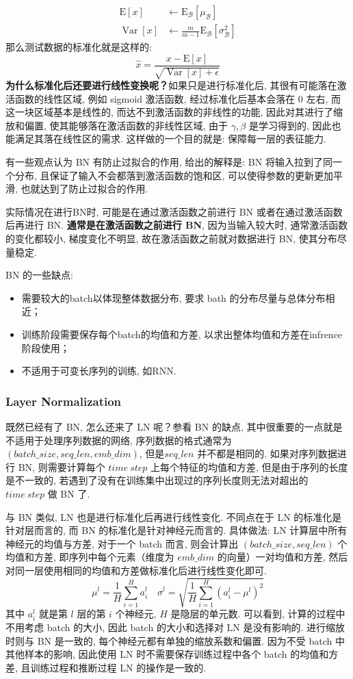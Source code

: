 $$
\begin{aligned}
	\mathrm{E}[x] & \leftarrow \mathrm{E}_{\mathcal{B}}\left[\mu_{\mathcal{B}}\right] \\
	\operatorname{Var}[x] & \leftarrow \frac{m}{m-1} \mathrm{E}_{\mathcal{B}}\left[\sigma_{\mathcal{B}}^{2}\right]
\end{aligned}
$$
那么测试数据的标准化就是这样的: 
$$
\widehat{x}=\frac{x-\mathrm{E}[x]}{\sqrt{\operatorname{Var}[x]+\epsilon}}
$$
\textbf{为什么标准化后还要进行线性变换呢？}如果只是进行标准化后, 其很有可能落在激活函数的线性区域, 例如 sigmoid 激活函数, 经过标准化后基本会落在 0 左右, 而这一块区域基本是线性的, 而达不到激活函数的非线性的功能, 因此对其进行了缩放和偏置, 使其能够落在激活函数的非线性区域, 由于 $\gamma, \beta$ 是学习得到的, 因此也能满足其落在线性区的需求. 这样做的一个目的就是: 保障每一层的表征能力. 

有一些观点认为 BN 有防止过拟合的作用, 给出的解释是: BN 将输入拉到了同一个分布, 且保证了输入不会都落到激活函数的饱和区, 可以使得参数的更新更加平滑, 也就达到了防止过拟合的作用. 


实际情况在进行BN时, 可能是在通过激活函数之前进行 BN 或者在通过激活函数后再进行 BN. \textbf{通常是在激活函数之前进行 BN}, 因为当输入较大时, 通常激活函数的变化都较小, 梯度变化不明显, 故在激活函数之前就对数据进行 BN, 使其分布尽量稳定. 

BN 的一些缺点: 
\begin{itemize}
	\item 需要较大的batch以体现整体数据分布, 要求 bath 的分布尽量与总体分布相近；
	\item 训练阶段需要保存每个batch的均值和方差, 以求出整体均值和方差在infrence阶段使用；
	\item 不适用于可变长序列的训练, 如RNN. 
\end{itemize}

\subsubsection{Layer Normalization}
既然已经有了 BN, 怎么还来了 LN 呢？参看 BN 的缺点, 其中很重要的一点就是不适用于处理序列数据的网络, 序列数据的格式通常为 $(batch\_size, seq\_len, emb\_dim)$, 但是$seq\_len$ 并不都是相同的. 如果对序列数据进行 BN, 则需要计算每个 $time\ step$ 上每个特征的均值和方差, 但是由于序列的长度是不一致的, 若遇到了没有在训练集中出现过的序列长度则无法对超出的 $time\ step$ 做 BN 了. 

与 BN 类似, LN 也是进行标准化后再进行线性变化. 不同点在于 LN 的标准化是针对层而言的, 而 BN 的标准化是针对神经元而言的. 具体做法: LN 计算层中所有神经元的均值与方差, 对于一个 batch 而言, 则会计算出 $(batch\_size, seq\_len)$ 个均值和方差, 即序列中每个元素（维度为 $emb\_dim$ 的向量）一对均值和方差, 然后对同一层使用相同的均值和方差做标准化后进行线性变化即可. 
$$
\mu^{l}=\frac{1}{H} \sum_{i=1}^{H} a_{i}^{l} \quad \sigma^{l}=\sqrt{\frac{1}{H} \sum_{i=1}^{H}\left(a_{i}^{l}-\mu^{l}\right)^{2}}
$$
其中 $a_i^l$ 就是第 $l$ 层的第 $i$ 个神经元, $H$ 是隐层的单元数. 可以看到, 计算的过程中不用考虑 batch 的大小, 因此 batch 的大小和选择对 LN 是没有影响的. 进行缩放时则与 BN 是一致的, 每个神经元都有单独的缩放系数和偏置. 因为不受 batch 中其他样本的影响, 因此使用 LN 时不需要保存训练过程中各个 batch 的均值和方差, 且训练过程和推断过程 LN 的操作是一致的. 

